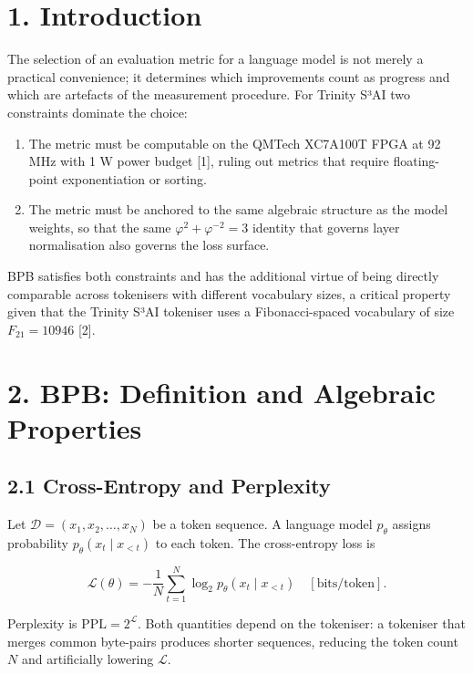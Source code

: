 \section{1. Introduction}\label{fa_14:introduction}

The selection of an evaluation metric for a
language model is not merely a practical
convenience; it determines which improvements
count as progress and which are artefacts of the
measurement procedure. For Trinity S³AI two
constraints dominate the choice:

\begin{enumerate}
\def\labelenumi{\arabic{enumi}.}
\tightlist
\item
  The metric must be computable on the QMTech
  XC7A100T FPGA at 92 MHz with 1 W power budget
  [1], ruling out metrics that require
  floating-point exponentiation or sorting.
\item
  The metric must be anchored to the same
  algebraic structure as the model weights, so
  that the same \(\varphi^2 + \varphi^{-2} = 3\)
  identity that governs layer normalisation also
  governs the loss surface.
\end{enumerate}

BPB satisfies both constraints and has the
additional virtue of being directly comparable
across tokenisers with different vocabulary sizes,
a critical property given that the Trinity S³AI
tokeniser uses a Fibonacci-spaced vocabulary of
size \(F_{21} = 10946\) [2].

\section{2. BPB: Definition and Algebraic
Properties}\label{fa_14:bpb-definition-and-algebraic-properties}

\subsection{2.1 Cross-Entropy and
Perplexity}\label{fa_14:cross-entropy-and-perplexity}

Let \(\mathcal{D} = (x_1, x_2, \ldots, x_N)\) be a
token sequence. A language model \(p_\theta\)
assigns probability \(p_\theta(x_t \mid x_{<t})\)
to each token. The cross-entropy loss is

\[\mathcal{L}(\theta) = -\frac{1}{N} \sum_{t=1}^{N} \log_2 p_\theta(x_t \mid x_{<t}) \quad [\text{bits/token}].\]

Perplexity is \(\text{PPL} = 2^{\mathcal{L}}\).
Both quantities depend on the tokeniser: a
tokeniser that merges common byte-pairs produces
shorter sequences, reducing the token count \(N\)
and artificially lowering \(\mathcal{L}\).

